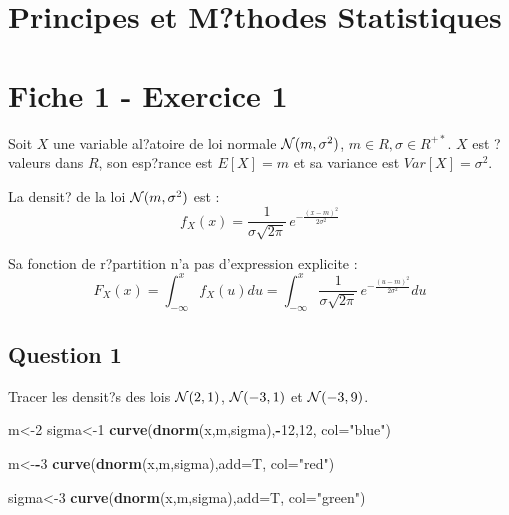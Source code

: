 \documentclass[]{article}
\author{}
\date{\vspace{-2.5em}}
\newenvironment{Shaded}{\begin{snugshade}}{\end{snugshade}}
\newcommand{\DataTypeTok}[1]{\textcolor[rgb]{0.13,0.29,0.53}{#1}}
\newcommand{\DecValTok}[1]{\textcolor[rgb]{0.00,0.00,0.81}{#1}}
\newcommand{\KeywordTok}[1]{\textcolor[rgb]{0.13,0.29,0.53}{\textbf{#1}}}
\newcommand{\NormalTok}[1]{#1}
\newcommand{\OperatorTok}[1]{\textcolor[rgb]{0.81,0.36,0.00}{\textbf{#1}}}
\newcommand{\StringTok}[1]{\textcolor[rgb]{0.31,0.60,0.02}{#1}}
\begin{document}
\hypertarget{principes-et-mthodes-statistiques}{%
\section{Principes et M?thodes
Statistiques}\label{principes-et-mthodes-statistiques}}

\hypertarget{fiche-1---exercice-1}{%
\section{Fiche 1 - Exercice 1}\label{fiche-1---exercice-1}}

Soit \(X\) une variable al?atoire de loi normale
\({\cal N}(m,\sigma^2)\), \(m \in R, \sigma \in R^{+*}\). \(X\) est ?
valeurs dans \(R\), son esp?rance est \(E[X]=m\) et sa variance est
\(Var[X]=\sigma^2\).

La densit? de la loi \({\cal N}(m,\sigma^2)\) est :
\[f_X(x) = {\displaystyle \frac{1}{\sigma \sqrt{2\pi}}} \, e^{  - \frac{(x - m)^2}{2\sigma^2}}\]

Sa fonction de r?partition n'a pas d'expression explicite :
\[F_X(x) = \int_{-\infty}^x f_X(u) du = \int_{-\infty}^x {\displaystyle \frac{1}{\sigma \sqrt{2\pi}}} \, e^{- \frac{(u - m)^2}{2\sigma^2}} du\]

\hypertarget{question-1}{%
\subsection{Question 1}\label{question-1}}

Tracer les densit?s des lois \({\cal N}(2,1)\), \({\cal N}(-3,1)\) et
\({\cal N}(-3,9)\).

\begin{Shaded}
\begin{Highlighting}[]
\NormalTok{m<-}\DecValTok{2}
\NormalTok{sigma<-}\DecValTok{1}
\KeywordTok{curve}\NormalTok{(}\KeywordTok{dnorm}\NormalTok{(x,m,sigma),}\OperatorTok{-}\DecValTok{12}\NormalTok{,}\DecValTok{12}\NormalTok{, }\DataTypeTok{col=}\StringTok{"blue"}\NormalTok{)}

\NormalTok{m<-}\OperatorTok{-}\DecValTok{3}
\KeywordTok{curve}\NormalTok{(}\KeywordTok{dnorm}\NormalTok{(x,m,sigma),}\DataTypeTok{add=}\NormalTok{T, }\DataTypeTok{col=}\StringTok{"red"}\NormalTok{)}

\NormalTok{sigma<-}\DecValTok{3}
\KeywordTok{curve}\NormalTok{(}\KeywordTok{dnorm}\NormalTok{(x,m,sigma),}\DataTypeTok{add=}\NormalTok{T, }\DataTypeTok{col=}\StringTok{"green"}\NormalTok{)}
\end{Highlighting}
\end{Shaded}
\end{document}
